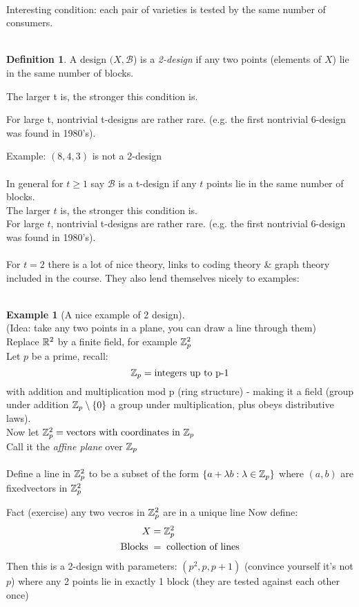 \documentclass[]{article}
\theoremstyle{definition}
\newtheorem*{defn}{Definition}
\newtheorem*{exmp}{Example}
\theoremstyle{remark}
\numberwithin{equation}{section}
\begin{document}
	\\
	Interesting condition: each pair of varieties is tested by the same number of consumers.\\
	\\
	\begin{defn}
	A design $(X, \mathscr{B}$) is a \emph{2-design} if any two points (elements of $X$) lie in the same number of blocks.

	The larger t is, the stronger this condition is.

	For large t, nontrivial t-designs are rather rare.
	(e.g. the first nontrivial 6-design was found in 1980’s).
	\end{defn}
	Example: $(8,4,3)$ is not a 2-design\\
	\\
	In general for $t \geq 1$ say $\mathscr{B}$ is a t-design if any $t$ points lie in the same number of blocks.\\
	The larger $t$ is, the stronger this condition is.\\
	For large $t$, nontrivial t-designs are rather rare. (e.g. the first nontrivial 6-design was found in 1980’s).\\
	\\
	For $t = 2$ there is a lot of nice theory, links to coding theory \& graph theory included in the course. They also lend themselves nicely to examples:\\
	\\
	\begin{exmp}[A nice example of 2 design]\hfill\\
	(Idea: take any two points in a plane, you can draw a line through them)\\
	Replace $\mathbb R^2$ by a finite field, for example $\mathbb{Z}_p^2$\\
	Let $p$ be a prime, recall: \\
	\[
		\mathbb{Z}_p = \text{integers up to p-1}
	\]
	with addition and multiplication mod p (ring structure) - making it a field (group under addition $\mathbb{Z}_p\setminus\{0\}$ a group under multiplication, plus obeys distributive laws).\\

	Now let $\mathbb{Z}_p^2 = \text{vectors with coordinates in $\mathbb{Z}_p$}$\\
	Call it the \emph{affine plane} over $\mathbb{Z}_p$\\
	\\
	Define a line in $\mathbb{Z}_p^2$ to be a subset of the form  $\{a + \lambda b: \lambda \in \mathbb{Z}_p\}$
	where $(a,b)$ are fixedvectors in $\mathbb{Z}_p^2$

	Fact (exercise) any two vecros in $\mathbb{Z}_p^2$ are in a unique line
	Now define:
	\begin{align*}
		X &= \mathbb{Z}_p^2\\
		\text{Blocks}\; &= \;\text{collection of lines}
	\end{align*}
	 Then this is a 2-design with parameters: $(p^2, p, p+1)$ (convince yourself it’s not $p$) where any 2 points lie in exactly 1 block (they are tested against each other once)\\
	\end{exmp}
\end{document}
